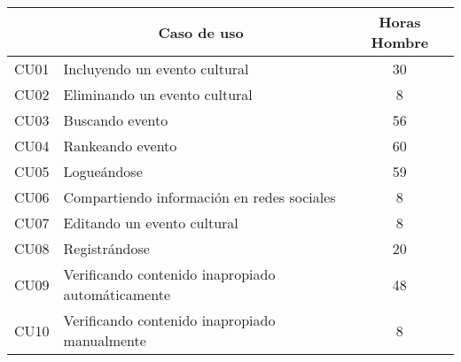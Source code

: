 \begin{table}[]
\centering
\begin{tabular}{|l|l|c|}
\hline
\rowcolor[HTML]{CBCEFB} 
\multicolumn{1}{|c|}{\cellcolor[HTML]{CBCEFB}\textbf{Código}} & \multicolumn{1}{c|}{\cellcolor[HTML]{CBCEFB}\textbf{Caso de uso}} & \textbf{Horas Hombre} \\ \hline
CU01                                                          & Incluyendo un evento cultural                                     & 30                    \\ \hline
CU02                                                          & Eliminando un evento cultural                                     & 8                     \\ \hline
CU03                                                          & Buscando evento                                                   & 56                    \\ \hline
CU04                                                          & Rankeando evento                                                  & 60                    \\ \hline
CU05                                                          & Logueándose                                                       & 59                    \\ \hline
CU06                                                          & Compartiendo información en redes sociales                        & 8                     \\ \hline
CU07                                                          & Editando un evento cultural                                       & 8                     \\ \hline
CU08                                                          & Registrándose                                                     & 20                    \\ \hline
CU09                                                          & Verificando contenido inapropiado automáticamente                 & 48                    \\ \hline
CU10                                                          & Verificando contenido inapropiado manualmente                     & 8                     \\ \hline

\end{tabular}
\end{table}
